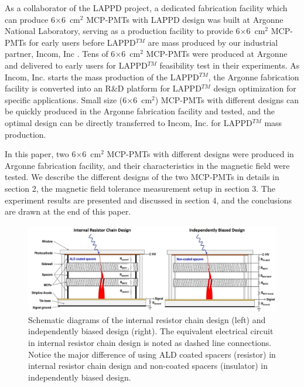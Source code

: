 \documentclass[preprint,5p]{elsarticle}
\begin{document}
As a collaborator of the LAPPD project, a dedicated fabrication facility 
\cite{15} which can produce 6$\times$6~cm$^2$ MCP-PMTs with LAPPD design was 
built at Argonne National Laboratory, serving as a production facility to 
provide 6$\times$6~cm$^2$ MCP-PMTs for early users before LAPPD$^{TM}$ are mass 
produced by our industrial partner, Incom, Inc \cite{16}. Tens of 
6$\times$6~cm$^2$ MCP-PMTs were produced at Argonne and delivered to early 
users for LAPPD$^{TM}$ feasibility test in their experiments. As Incom, Inc.  
starts the mass production of the LAPPD$^{TM}$, the Argonne fabrication 
facility is converted into an R\&D platform for LAPPD$^{TM}$ design 
optimization for specific applications. Small size (6$\times$6~cm$^2$) MCP-PMTs 
with different designs can be quickly produced in the Argonne fabrication 
facility and tested, and the optimal design can be directly transferred to 
Incom, Inc. for LAPPD$^{TM}$ mass production. 

In this paper, two 6$\times$6~cm$^2$ MCP-PMTs with different designs were 
produced in Argonne fabrication facility, and their characteristics in the 
magnetic field were tested. We describe the different designs of the two 
MCP-PMTs in details in section 2, the magnetic field tolerance measurement 
setup in section 3. The experiment results are presented and discussed in 
section 4, and the conclusions are drawn at the end of this paper.



\begin{figure}[tbp]
\centering \includegraphics[scale=1.1]{fig/qqXSwD.jpg}
\caption{Schematic diagrams of the internal resistor chain design (left) and 
   independently biased design (right). The equivalent electrical circuit in 
   internal resistor chain design is noted as dashed line connections. Notice 
   the major difference of using ALD coated spacers (resistor) in internal 
   resistor chain design and non-coated spacers (insulator) in independently 
   biased design.} \label{fig:design}
\end{figure}
\end{document}
